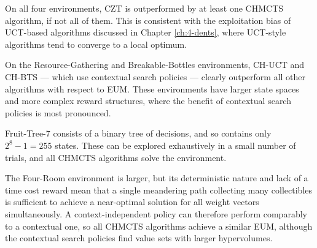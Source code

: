     On all four environments, CZT is outperformed by at least one CHMCTS algorithm, if not all of them. This is consistent with the exploitation bias of UCT-based algorithms discussed in Chapter \ref{ch:4-dents}, where UCT-style algorithms tend to converge to a local optimum.

    On the Resource-Gathering and Breakable-Bottles environments, CH-UCT and CH-BTS --- which use contextual search policies --- clearly outperform all other algorithms with respect to EUM. These environments have larger state spaces and more complex reward structures, where the benefit of contextual search policies is most pronounced.

    Fruit-Tree-7 consists of a binary tree of decisions, and so contains only \mbox{$2^8-1=255$} states. These can be explored exhaustively in a small number of trials, and all CHMCTS algorithms solve the environment.

    The Four-Room environment is larger, but its deterministic nature and lack of a time cost reward mean that a single meandering path collecting many collectibles is sufficient to achieve a near-optimal solution for all weight vectors simultaneously. A context-independent policy can therefore perform comparably to a contextual one, so all CHMCTS algorithms achieve a similar EUM, although the contextual search policies find value sets with larger hypervolumes.











